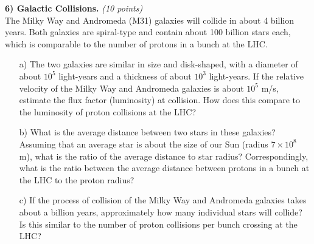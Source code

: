 {\textbf{6) Galactic Collisions.} \hfill \textit{(10 points)}\\
The Milky Way and Andromeda (M31) galaxies will collide in about 4 billion years. 
Both galaxies are spiral-type and contain about 100 billion stars each, which is comparable to the number of protons in a bunch at the LHC. 
\begin{itemize}
\item[a)] {The two galaxies are similar in size and disk-shaped, with a diameter of about $10^5$ light-years and a thickness of about $10^3$ light-years. 
If the relative velocity of the Milky Way and Andromeda galaxies is about $10^5$ m/s, estimate the flux factor (luminosity) at collision. 
How does this compare to the luminosity of proton collisions at the LHC?
}
\item[b)] {What is the average distance between two stars in these galaxies? 
Assuming that an average star is about the size of our Sun (radius $7 \times 10^8$ m), what is the ratio of the average distance to star radius? 
Correspondingly, what is the ratio between the average distance between protons in a bunch at the LHC to the proton radius? 
}
\item[c)] {If the process of collision of the Milky Way and Andromeda galaxies takes about a billion years, approximately how many individual stars will collide? 
Is this similar to the number of proton collisions per bunch crossing at the LHC?}
\end{itemize}


}






